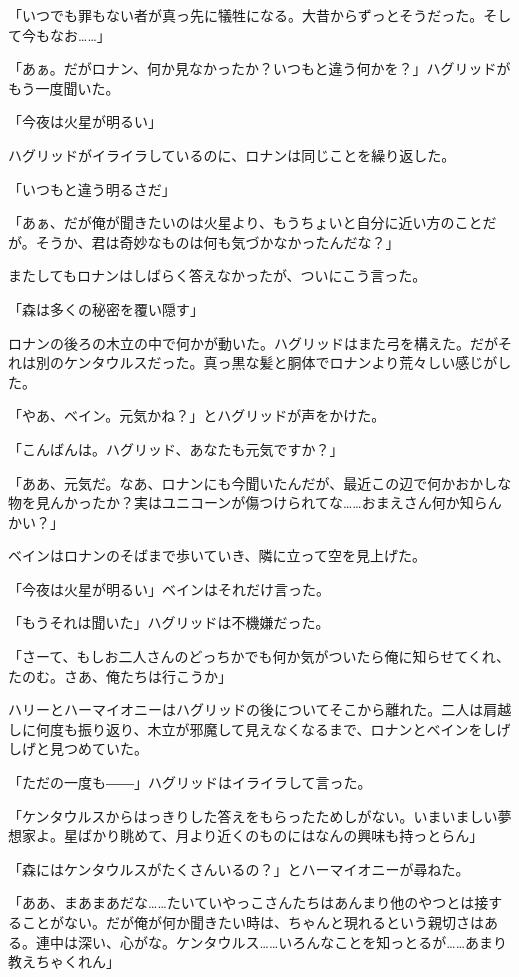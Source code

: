 \documentclass[10pt,a4paper]{article}
\begin{document}
\begin{CJK}{UTF8}{min}
「いつでも罪もない者が真っ先に犠牲になる。大昔からずっとそうだった。そして今もなお……」

「あぁ。だがロナン、何か見なかったか？いつもと違う何かを？」ハグリッドがもう一度聞いた。

「今夜は火星が明るい」

ハグリッドがイライラしているのに、ロナンは同じことを繰り返した。

「いつもと違う明るさだ」

「あぁ、だが俺が聞きたいのは火星より、もうちょいと自分に近い方のことだが。そうか、君は奇妙なものは何も気づかなかったんだな？」

またしてもロナンはしばらく答えなかったが、ついにこう言った。

「森は多くの秘密を覆い隠す」

ロナンの後ろの木立の中で何かが動いた。ハグリッドはまた弓を構えた。だがそれは別のケンタウルスだった。真っ黒な髪と胴体でロナンより荒々しい感じがした。

「やあ、ベイン。元気かね？」とハグリッドが声をかけた。

「こんばんは。ハグリッド、あなたも元気ですか？」

「ああ、元気だ。なあ、ロナンにも今聞いたんだが、最近この辺で何かおかしな物を見んかったか？実はユニコーンが傷つけられてな……おまえさん何か知らんかい？」

ベインはロナンのそばまで歩いていき、隣に立って空を見上げた。

「今夜は火星が明るい」ベインはそれだけ言った。

「もうそれは聞いた」ハグリッドは不機嫌だった。

「さーて、もしお二人さんのどっちかでも何か気がついたら俺に知らせてくれ、たのむ。さあ、俺たちは行こうか」

ハリーとハーマイオニーはハグリッドの後についてそこから離れた。二人は肩越しに何度も振り返り、木立が邪魔して見えなくなるまで、ロナンとベインをしげしげと見つめていた。

「ただの一度も――」ハグリッドはイライラして言った。

「ケンタウルスからはっきりした答えをもらったためしがない。いまいましい夢想家よ。星ばかり眺めて、月より近くのものにはなんの興味も持っとらん」

「森にはケンタウルスがたくさんいるの？」とハーマイオニーが尋ねた。

「ああ、まあまあだな……たいていやっこさんたちはあんまり他のやつとは接することがない。だが俺が何か聞きたい時は、ちゃんと現れるという親切さはある。連中は深い、心がな。ケンタウルス……いろんなことを知っとるが……あまり教えちゃくれん」


\end{CJK}
\end{document}
